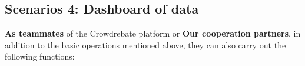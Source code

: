 \subsection{Scenarios 4: Dashboard of data}

\textbf{As teammates} of the Crowdrebate platform or \textbf{Our cooperation partners}, in addition to the basic operations mentioned above, they can also carry out the following functions:

\begin{figure}[t!] \vspace{-1ex}
\end{figure}
